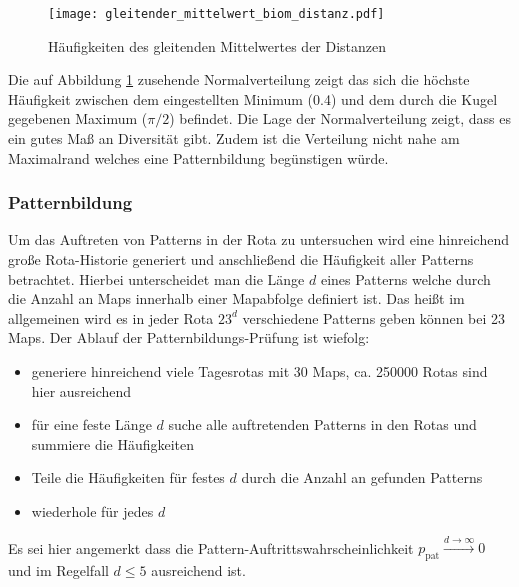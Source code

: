             \begin{figure}[htbp]
                \centering
                \texttt{[image: gleitender\_mittelwert\_biom\_distanz.pdf]}
                \caption{Häufigkeiten des gleitenden Mittelwertes der Distanzen}
                \label{fig:haufigkeit_gleitender_mittelwert}
            \end{figure}

            Die auf Abbildung \ref{fig:haufigkeit_gleitender_mittelwert} zusehende Normalverteilung zeigt das sich die höchste
            Häufigkeit zwischen dem eingestellten Minimum (0.4) und dem durch die Kugel gegebenen Maximum ($\pi/2$) befindet.
            Die Lage der Normalverteilung zeigt, dass es ein gutes Maß an Diversität gibt. Zudem ist die
            Verteilung nicht nahe am Maximalrand welches eine Patternbildung begünstigen würde.


        \subsubsection{Patternbildung}
        Um das Auftreten von Patterns in der Rota zu untersuchen wird eine hinreichend große Rota-Historie generiert und anschließend die Häufigkeit aller Patterns betrachtet.
        Hierbei unterscheidet man die Länge $d$ eines Patterns welche durch die Anzahl an Maps innerhalb einer Mapabfolge definiert ist. 
        Das heißt im allgemeinen wird es in jeder Rota $23^d$ verschiedene Patterns geben können bei 23 Maps. 
        Der Ablauf der Patternbildungs-Prüfung ist wiefolg:
        \begin{itemize}
            \item generiere hinreichend viele Tagesrotas mit 30 Maps, ca. 250000 Rotas sind hier ausreichend
            \item für eine feste Länge $d$ suche alle auftretenden Patterns in den Rotas und summiere die Häufigkeiten
            \item Teile die Häufigkeiten für festes $d$ durch die Anzahl an gefunden Patterns 
            \item wiederhole für jedes $d$
        \end{itemize}
        Es sei hier angemerkt dass die Pattern-Auftrittswahrscheinlichkeit $p_\text{pat}\overset{d\rightarrow \infty}{\longrightarrow}0$ und im Regelfall $d\leq5$ ausreichend ist.
        
